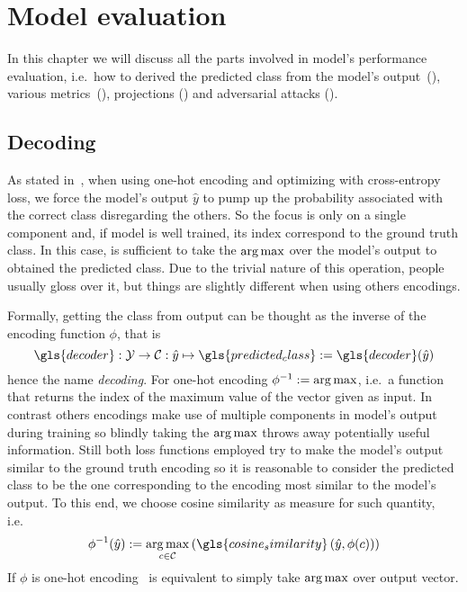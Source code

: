 \chapter{Model evaluation}
\label{ch:model-evaluation}

In this chapter we will discuss all the parts involved in model's performance evaluation, i.e.\ how to derived the predicted class from the model's output~(), various metrics~(), projections () and adversarial attacks ().

\section{Decoding}
\label{sec:decoding}

As stated in~, when using one-hot encoding and optimizing with cross-entropy loss, we force the model's output $\hat{y}$ to pump up the probability associated with the correct class disregarding the others. So the focus is only on a single component and, if model is well trained, its index correspond to the ground truth class. In this case, is sufficient to take the $\operatorname*{arg\,max}$ over the model's output to obtained the predicted class.
Due to the trivial nature of this operation, people usually gloss over it, but things are slightly different when using others encodings.\medskip

Formally, getting the class from output can be thought as the inverse of the encoding function $\phi$, that is
\begin{equation}
  \gls{decoder} : \mathcal{Y} \to \mathcal{C}
  : \hat{y} \mapsto \gls{predicted_class} := \gls{decoder}(\hat{y})
  \label{eq:decoding}
\end{equation}
hence the name \emph{decoding}.
For one-hot encoding $\phi^{-1} := \operatorname*{arg\,max}$, i.e.\ a function that returns the index of the maximum value of the vector given as input. In contrast others encodings make use of multiple components in model's output during training so blindly taking the $\operatorname*{arg\,max}$ throws away potentially useful information. Still both loss functions employed try to make the model's output similar to the ground truth encoding so it is reasonable to consider the predicted class to be the one corresponding to the encoding most similar to the model's output.
To this end, we choose cosine similarity as measure for such quantity, i.e.\
\begin{equation}
  \phi^{-1}(\hat{y}) := \argmax_{c \in \mathcal{C}}
  \left( \gls{cosine_similarity} \left(\hat{y}, \phi(c) \right) \right)
  \label{eq:decoding-cos-sim}
\end{equation}
If $\phi$ is one-hot encoding~ is equivalent to simply take $\operatorname*{arg\,max}$ over output vector.

